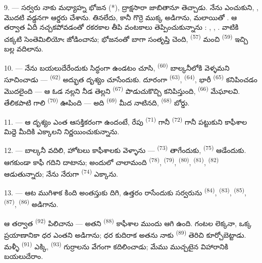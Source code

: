 \VUsaut{4.0mm}
\VUsaut{3.0mm}

9. --- సర్వరు నాకు మధ్యాహ్న భోజన  (*), ద్రాక్షసారా జాబితానూ తెచ్చాడు.
నేను ఎంచుకుని,   , మొదటి
వడ్డనగా  ఆర్డరు చేశాను.  తినలేదు, కానీ
గొర్రె  ముక్క అడిగాను,  మలాయితో .
ఆ తర్వాత  ఏదీ నచ్చకపోవడంతో రకరకాల తీపి వంటకాలు తెప్పించుకున్నాను :
, , . వాటికి చక్కటి సెంతెమిలియోఁ
 జోడించాను; భోజనంతో బాగా సంతృప్తి చెంది, 
\textsuperscript{(57)} మంచి  \textsuperscript{(59)} ఇచ్చి బల్ల వదిలాను.

10. --- నేను బయలుదేరేందుకు సిద్ధంగా ఉండటం చూసి, 
\textsuperscript{(60)} బాల్కనీలోకి వెళ్ళమని సూచించాడు — 
\textsuperscript{(62)} అద్భుత దృశ్యం చూసేందుకు. దూరంగా 
\textsuperscript{(63)},  \textsuperscript{(64)}, భారీ
 \textsuperscript{(65)} కనిపించడం మొదలైంది — ఆ ఓడ నల్లని నీడ తెల్లని
 \textsuperscript{(67)} పొడుచుకొచ్చి కనిపిస్తుంది, 
\textsuperscript{(66)} మేఘాలవి. తేలికపాటి గాలి  \textsuperscript{(70)}
ఊపింది — అది  \textsuperscript{(69)} మీద నాటినది,
 \textsuperscript{(68)} బోర్డు.

\VUsaut{3.0mm}
\VUsaut{3.0mm}

11. --- ఆ దృశ్యం ఎంత ఆసక్తికరంగా ఉందంటే, రేపు 
\textsuperscript{(71)} గానీ  \textsuperscript{(72)} గానీ పట్టుకుని
కాఫీశాల మిద్దె మీదికి ఎక్కాలని నిర్ణయించుకున్నాను.

12. --- బాల్కనీ వదిలి, హోటలు కాఫీశాలకు వెళ్ళాను — 
\textsuperscript{(73)} తాగేందుకు,  \textsuperscript{(75)}
ఆడేందుకు. ఆగకుండా కాఫీ గదిని దాటాను; అందులో చాలామంది 
\textsuperscript{(78)},  \textsuperscript{(79)},
 \textsuperscript{(80)}, 
\textsuperscript{(81)},  \textsuperscript{(82)} ఆడుతున్నారు; నేను నేరుగా
 \textsuperscript{(74)} ఎక్కాను.

13. --- ఆట ముగిశాక కింది అంతస్తుకు దిగి, ఉత్తరం రాసేందుకు సర్వరును 
\textsuperscript{(84)},  \textsuperscript{(83)},
 \textsuperscript{(85)},  \textsuperscript{(87)},
 \textsuperscript{(86)} అడిగాను.

ఆ తర్వాత  \textsuperscript{(92)} పిలిచాను — అతని 
\textsuperscript{(88)} కాఫీశాల ముందు ఆగి ఉంది. గంటల లెక్కనా, ఒక్క ప్రయాణానికా ధర ఎంతని
అడిగాను; ధర కుదిరాక అతను నాకు  \textsuperscript{(89)} తెరిచి
కూర్చోబెట్టాడు. మళ్ళీ  \textsuperscript{(91)} ఎక్కి,
 \textsuperscript{(93)} గుర్రాలను వేగంగా కదిలించాడు; మేము ముచ్చటైన
విహారానికి బయలుదేరాం.

\VUsaut{6.0mm}
\VUfilet{22mm}
